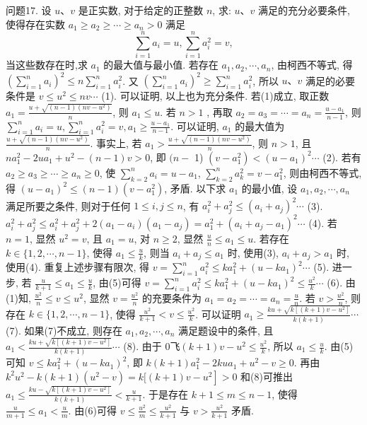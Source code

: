 问题17. 设 $u 、 v$ 是正实数, 对于给定的正整数 $n$, 求: $u 、 v$ 满足的充分必要条件, 使得存在实数 $a_1 \geqslant a_2 \geqslant \cdots \geqslant a_n>0$ 满足
$$
\sum_{i=1}^n a_i=u, \sum_{i=1}^n a_i^2=v,
$$
当这些数存在时,求 $a_1$ 的最大值与最小值.
若存在 $a_1, a_2, \cdots, a_n$, 由柯西不等式, 得 $\left(\sum_{i=1}^n a_i\right)^2 \leqslant n \sum_{i=1}^n a_i^2$. 又 $\left(\sum_{i=1}^n a_i\right)^2 \geqslant \sum_{i=1}^n a_i^2$, 所以 $u 、 v$ 满足的必要条件是 $v \leqslant u^2 \leqslant n v \cdots$ (1). 可以证明, 以上也为充分条件.
若(1)成立, 取正数 $a_1=\frac{u+\sqrt{(n-1)\left(n v-u^2\right)}}{n}$, 则 $a_1 \leqslant u$. 
若 $n>1$ , 再取 $a_2=a_3=\cdots=a_n=\frac{u-a_1}{n-1}$, 则 $\sum_{i=1}^n a_i=u, \sum_{i=1}^n a_i^2=v, a_1 \geqslant \frac{u-a_1}{n-1}$. 可以证明, $a_1$ 的最大值为 $\frac{u+\sqrt{(n-1)\left(n v-u^2\right)}}{n}$. 事实上, 若 $a_1> \frac{u+\sqrt{(n-1)\left(n v-u^2\right)}}{n}$, 则 $n>1$, 且 $n a_1^2-2 u a_1+u^2-(n-1) v>0$, 即 $(n-$ 1) $\left(v-a_1^2\right)<\left(u-a_1\right)^2 \cdots$ (2). 若有 $a_2 \geqslant a_3 \geqslant \cdots \geqslant a_n \geqslant 0$, 使 $\sum_{k=2}^n a_i=u-a_1$, $\sum_{k=2}^n a_k^2=v-a_1^2$, 则由柯西不等式, 得 $\left(u-a_1\right)^2 \leqslant(n-1)\left(v-a_1^2\right)$, 矛盾.
以下求 $a_1$ 的最小值, 设 $a_1, a_2, \cdots, a_n$ 满足所要之条件, 则对于任何 $1 \leqslant i, j \leqslant n$, 有 $a_i^2+a_j^2 \leqslant\left(a_i+a_j\right)^2 \cdots$ (3). $a_i^2+a_j^2 \leqslant a_i^2+a_j^2+2\left(a_1-a_i\right)\left(a_1-a_j\right)=a_1^2+ \left(a_i+a_j-a_1\right)^2 \cdots$ (4). 若 $n=1$, 显然 $u^2=v$, 且 $a_1=u$, 对 $n \geqslant 2$, 显然 $\frac{u}{n} \leqslant a_1 \leqslant u$. 若存在 $k \in\{1,2, \cdots, n-1\}$, 使得 $a_1 \leqslant \frac{u}{k}$, 则当 $a_i+a_j \leqslant a_1$ 时, 使用(3), $a_i+a_j>a_1$ 时, 使用(4). 重复上述步骤有限次, 得 $v=\sum_{i=1}^n a_i^2 \leqslant k a_1^2+ \left(u-k a_1\right)^2 \cdots$ (5). 进一步, 若 $\frac{u}{k+1} \leqslant a_1 \leqslant \frac{u}{k}$, 由(5)可得 $v=\sum_{i=1}^n a_i^2 \leqslant k a_1^2+ \left(u-k a_1\right)^2 \leqslant \frac{u^2}{k} \cdots$ (6). 由(1)知, $\frac{u^2}{n} \leqslant v \leqslant u^2$, 显然 $v=\frac{u^2}{n}$ 的充要条件为 $a_1= a_2=\cdots=a_n=\frac{u}{n}$. 若 $v>\frac{u^2}{n}$, 则存在 $k \in\{1,2, \cdots, n-1\}$, 使得 $\frac{u^2}{k+1}< v \leqslant \frac{u^2}{k}$. 可以证明 $a_1 \geqslant \frac{k u+\sqrt{k\left[(k+1) v-u^2\right]}}{k(k+1)} \cdots$ (7). 如果(7)不成立, 则存在 $a_1, a_2, \cdots, a_n$ 满足题设中的条件, 且 $a_1<\frac{k u+\sqrt{k\left[(k+1) v-u^2\right]}}{k(k+1)} \cdots$ (8). 由于 $0 飞(k+1) v-u^2 \leqslant \frac{u^2}{k}$, 所以 $a_1 \leqslant \frac{u}{k}$. 由(5)可知 $v \leqslant k a_1^2+\left(u-k a_1\right)^2$, 即 $k(k+1) a_1^2-2 k u a_1+u^2-v \geqslant 0$. 再由 $k^2 u^2-k(k+1)\left(u^2-v\right)=k[(k+1) v- \left.u^2\right]>0$ 和(8)可推出 $a_1 \leqslant \frac{k u-\sqrt{k\left[(k+1) v-u^2\right]}}{k(k+1)}<\frac{u}{k+1}$. 于是存在 $k+ 1 \leqslant m \leqslant n-1$, 使得 $\frac{u}{m+1} \leqslant a_1<\frac{u}{m}$. 由(6)可得 $v \leqslant \frac{u^2}{m} \leqslant \frac{u^2}{k+1}$ 与 $v>\frac{u^2}{k+1}$ 矛盾.
